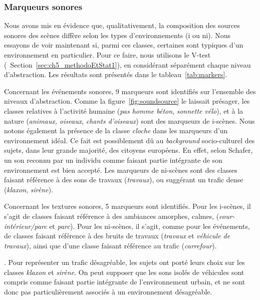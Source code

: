 \subsubsection{Marqueurs sonores}
\label{sec:ch5_marqueurXp1}

Nous avons mis en évidence que, qualitativement, la composition des sources sonores des scènes diffère selon les types d'environnements (i ou ni). Nous essayons de voir maintenant si, parmi ces classes, certaines sont typiques d'un environnement en particulier. Pour ce faire, nous utilisons le V-test (\cf~Section~\ref{sec:ch5_methodoEtStat1}), en considérant séparément chaque niveau d'abstraction. Les résultats sont présentés dans le tableau~\ref{tab:markers}.

Concernant les événements sonores, 9 marqueurs sont identifiés sur l'ensemble des niveaux d'abstraction. Comme la figure~\ref{fig:soundsource} le laissait présager, les classes relatives à l'activité humaine (\emph{pas homme béton}, \emph{sonnette vélo}), et à la nature (\emph{animaux, oiseaux}, \emph{chants d'oiseaux}) sont des marqueurs de i-scènes. Nous notons également la présence de la classe \emph{cloche} dans les marqueurs d'un environnement idéal. Ce fait est possiblement dû au \emph{background} socio-culturel des sujets, dans leur grande majorité, des citoyens européens. En effet, selon Schafer, un son reconnu par un individu comme faisant partie intégrante de son environnement est bien accepté. Les marqueurs de ni-scènes sont des classes faisant référence à des sons de travaux (\emph{travaux}), ou suggérant un trafic dense (\emph{klaxon}, \emph{sirène}).

Concernant les textures sonores, 5 marqueurs sont identifiés. Pour les i-scènes, il s'agit de classes faisant référence à des ambiances amorphes, calmes, (\emph{cour-intérieur/parc} et \emph{parc}). Pour les ni-scènes, il s'agit, comme pour les événements, de classes faisant référence à des bruits de travaux (\emph{travaux} et \emph{véhicule de travaux}), ainsi que d'une classe faisant référence au trafic (\emph{carrefour}).


. Pour représenter un trafic désagréable, les sujets ont porté leurs choix sur les classes \emph{klaxon} et \emph{sirène}. On peut supposer que les sons isolés de véhicules sont compris comme faisant partie intégrante de l'environnement urbain, et ne sont donc pas particulièrement associés à un environnement désagréable. \\ 

